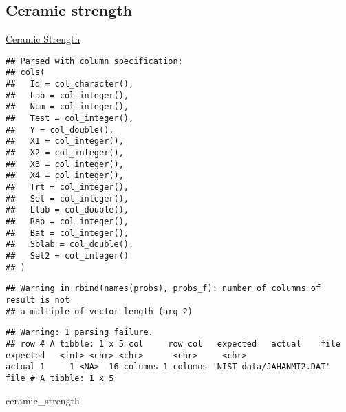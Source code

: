 \documentclass[]{book}
\newenvironment{Shaded}{\begin{snugshade}}{\end{snugshade}}
\newcommand{\DataTypeTok}[1]{\textcolor[rgb]{0.13,0.29,0.53}{#1}}
\newcommand{\DecValTok}[1]{\textcolor[rgb]{0.00,0.00,0.81}{#1}}
\newcommand{\KeywordTok}[1]{\textcolor[rgb]{0.13,0.29,0.53}{\textbf{#1}}}
\newcommand{\NormalTok}[1]{#1}
\newcommand{\OperatorTok}[1]{\textcolor[rgb]{0.81,0.36,0.00}{\textbf{#1}}}
\newcommand{\OtherTok}[1]{\textcolor[rgb]{0.56,0.35,0.01}{#1}}
\newcommand{\StringTok}[1]{\textcolor[rgb]{0.31,0.60,0.02}{#1}}
\theoremstyle{definition}
\theoremstyle{definition}
\theoremstyle{definition}
\theoremstyle{remark}
\begin{document}
\hypertarget{ceramic-strength}{%
\subsection{Ceramic strength}\label{ceramic-strength}}

\href{https://www.itl.nist.gov/div898/handbook/eda/section4/eda42a.htm}{Ceramic
Strength}

\begin{Shaded}
\end{Shaded}

\begin{verbatim}
## Parsed with column specification:
## cols(
##   Id = col_character(),
##   Lab = col_integer(),
##   Num = col_integer(),
##   Test = col_integer(),
##   Y = col_double(),
##   X1 = col_integer(),
##   X2 = col_integer(),
##   X3 = col_integer(),
##   X4 = col_integer(),
##   Trt = col_integer(),
##   Set = col_integer(),
##   Llab = col_double(),
##   Rep = col_integer(),
##   Bat = col_integer(),
##   Sblab = col_double(),
##   Set2 = col_integer()
## )
\end{verbatim}

\begin{verbatim}
## Warning in rbind(names(probs), probs_f): number of columns of result is not
## a multiple of vector length (arg 2)
\end{verbatim}

\begin{verbatim}
## Warning: 1 parsing failure.
## row # A tibble: 1 x 5 col     row col   expected   actual    file                     expected   <int> <chr> <chr>      <chr>     <chr>                    actual 1     1 <NA>  16 columns 1 columns 'NIST data/JAHANMI2.DAT' file # A tibble: 1 x 5
\end{verbatim}

\begin{Shaded}
\begin{Highlighting}[]
\NormalTok{ceramic_strength}
\end{Highlighting}
\end{Shaded}
\end{document}
